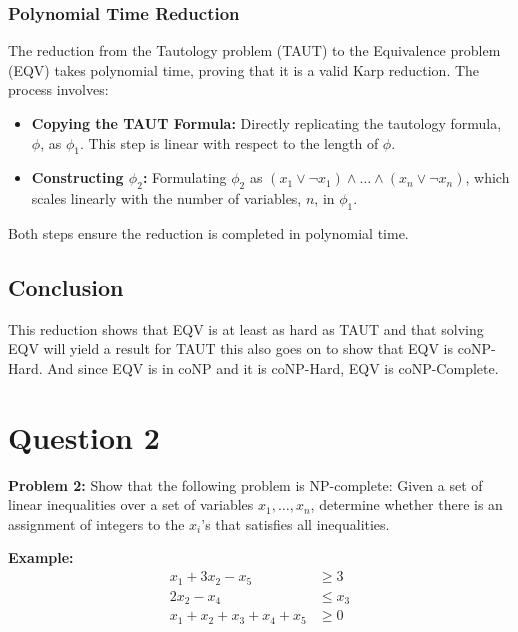 \documentclass{article}
\begin{document}
\pagebreak
\subsubsection*{Polynomial Time Reduction}

The reduction from the Tautology problem (TAUT) to the Equivalence problem (EQV) takes polynomial time, proving that it is a valid Karp reduction. The process involves:

\begin{itemize}
    \item \textbf{Copying the TAUT Formula:} Directly replicating the tautology formula, \( \phi \), as \( \phi_1 \). This step is linear with respect to the length of \( \phi \).
    \item \textbf{Constructing \( \phi_2 \):} Formulating \( \phi_2 \) as \( (x_1 \lor \lnot x_1) \land \ldots \land (x_n \lor \lnot x_n) \), which scales linearly with the number of variables, \( n \), in \( \phi_1 \).
\end{itemize}

Both steps ensure the reduction is completed in polynomial time.

\subsection*{Conclusion}
This reduction shows that EQV is at least as hard as TAUT and that solving EQV will yield a result for TAUT this also goes on to show that EQV is coNP-Hard. And since EQV is in coNP and it is coNP-Hard, EQV is coNP-Complete.



\pagebreak
\section{Question 2}
\textbf{Problem 2:} Show that the following problem is NP-complete: Given a set of linear inequalities over a set of variables \(x_1, \dots, x_n\), determine whether there is an assignment of integers to the \(x_i\)'s that satisfies all inequalities.

\textbf{Example:}
\begin{align*}
    x_1 + 3x_2 - x_5 &\geq 3 \\
    2x_2 - x_4 &\leq x_3 \\
    x_1 + x_2 + x_3 + x_4 + x_5 &\geq 0
\end{align*}
\end{document}
